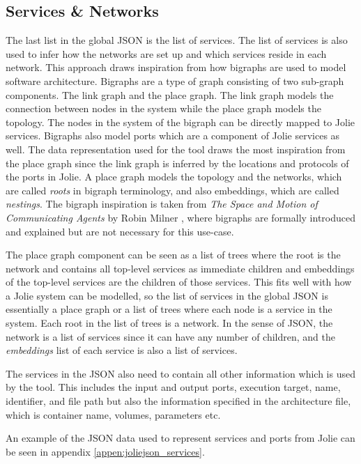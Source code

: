 \subsection{Services \& Networks}
The last list in the global JSON is the list of services. The list of services is also used to infer how the networks are set up and which services reside in each network.
This approach draws inspiration from how bigraphs are used to model software architecture. Bigraphs are a type of graph consisting of two sub-graph components. The link graph and the place graph. The link graph models the connection between nodes in the system while the place graph models the topology.
The nodes in the system of the bigraph can be directly mapped to Jolie services. Bigraphs also model ports which are a component of Jolie services as well.
The data representation used for the tool draws the most inspiration from the place graph since the link graph is inferred by the locations and protocols of the ports in Jolie.
A place graph models the topology and the networks, which are called \textit{roots} in bigraph terminology, and also embeddings, which are called \textit{nestings}.
The bigraph inspiration is taken from \textit{The Space and Motion of Communicating Agents} by Robin Milner \cite{BigraphBook}, where bigraphs are formally introduced and explained but are not necessary for this use-case.

The place graph component can be seen as a list of trees where the root is the network and contains all top-level services as immediate children and embeddings of the top-level services are the children of those services.
This fits well with how a Jolie system can be modelled, so the list of services in the global JSON is essentially a place graph or a list of trees where each node is a service in the system.
Each root in the list of trees is a network. In the sense of JSON, the network is a list of services since it can have any number of children, and the \textit{embeddings} list of each service is also a list of services.

The services in the JSON also need to contain all other information which is used by the tool.
This includes the input and output ports, execution target, name, identifier, and file path but also the information specified in the architecture file, which is container name, volumes, parameters etc.

An example of the JSON data used to represent services and ports from Jolie can be seen in appendix \ref*{appen:joliejson_services}.

